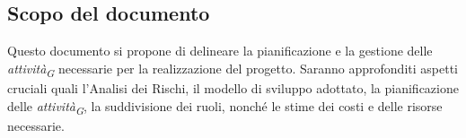 \subsection{Scopo del documento}
Questo documento si propone di delineare la pianificazione e la gestione delle \textit{attività}\textsubscript{\textit{G}} necessarie per la realizzazione del progetto. Saranno approfonditi aspetti cruciali quali l'Analisi dei Rischi, il modello di sviluppo adottato, la pianificazione delle \textit{attività}\textsubscript{\textit{G}}, la suddivisione dei ruoli, nonché le stime dei costi e delle risorse necessarie.
